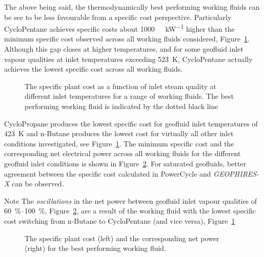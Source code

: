     The above being said, the thermodynamically best performing working fluids can be see to be less favourable from a specific cost perspective. Particularly CycloPentane achieves specific costs about \qty{1000}{\USD{}\per\kilo\watt} higher than the minimum specific cost observed across all working fluids considered, Figure~\ref{fig:prosim_purewater_specCost_by_wf}. Although this gap closes at higher temperatures, and for some geofluid inlet vapour qualities at inlet temperatures exceeding \qty{523}{\K}, CycloPentane actually achieves the lowest specific cost across all working fluids. 

    \begin{figure}[H]
        \centering
        
        \caption[The specific plant cost as a function of inlet steam quality at different inlet temperatures for a range of working fluids.]{The specific plant cost as a function of inlet steam quality at different inlet temperatures for a range of working fluids. The best performing working fluid is indicated by the dotted black line}
        \label{fig:prosim_purewater_specCost_by_wf}
    \end{figure}

    CycloPropane produces the lowest specific cost for geofluid inlet temperatures of \qty{423}{\K} and n-Butane produces the lowest cost for virtually all other inlet conditions investigated, see Figure~\ref{fig:prosim_purewater_specCost_by_wf}. The minimum specific cost and the corresponding net electrical power across all working fluids for the different geofluid inlet conditions is shown in Figure~\ref{fig:prosim_purewater_specCost_bestWf}. For saturated geofluids, better agreement between the specific cost calculated in PowerCycle and \emph{GEOPHIRES-X} can be observed.

    \begin{notes}{Note}
        The \emph{oscillations} in the net power between geofluid inlet vapour qualities of \qtyrange{60}{100}{\percent}, Figure~\ref{fig:prosim_purewater_specCost_bestWf}, are a result of the working fluid with the lowest specific cost switching from n-Butane to CycloPentane (and vice versa), Figure~\ref{fig:prosim_purewater_specCost_by_wf}
    \end{notes}

    \begin{figure}[H]
        \centering
        
        \caption{The specific plant cost (left) and the corresponding net power (right) for the best performing working fluid.}
        \label{fig:prosim_purewater_specCost_bestWf}
    \end{figure}

